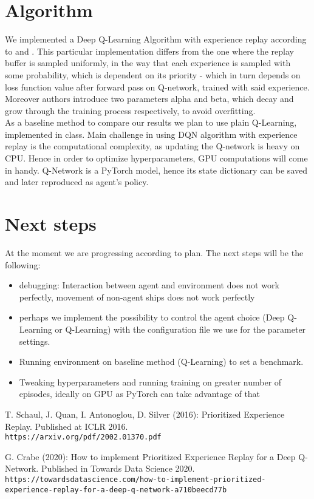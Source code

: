 \documentclass[11pt]{article} %
\begin{document}
\section{Algorithm}
We implemented a Deep Q-Learning Algorithm with experience replay according to \cite{schaul_2016} and \cite{crabe_2020}. This particular implementation differs from the one where the replay buffer is sampled uniformly, in the way that each experience is sampled with some probability, which is dependent on its priority - which in turn depends on loss function value after forward pass on Q-network, trained with said experience. Moreover authors introduce two parameters alpha and beta, which decay and grow through the training process respectively, to avoid overfitting. \\
As a baseline method to compare our results we plan to use plain Q-Learning, implemented in class. Main challenge in using DQN algorithm with experience replay is the computational complexity, as updating the Q-network is heavy on CPU. Hence in order to optimize hyperparameters, GPU computations will come in handy. Q-Network is a PyTorch model, hence its state dictionary can be saved and later reproduced as agent's policy.

\section{Next steps}
At the moment we are progressing according to plan. The next steps will be the following:
\begin{itemize}
	\item debugging: Interaction between agent and environment does not work perfectly, movement of non-agent ships does not work perfectly
	\item perhaps we implement the possibility to control the agent choice (Deep Q-Learning or Q-Learning) with the configuration file we use for the parameter settings.
	\item Running environment on baseline method (Q-Learning) to set a benchmark.
	\item Tweaking hyperparameters and running training on greater number of episodes, ideally on GPU as PyTorch can take advantage of that

\end{itemize}



\begin{thebibliography}{2}

T. Schaul, J. Quan, I. Antonoglou, D. Silver (2016): Prioritized Experience Replay. Published at ICLR 2016.\\
\texttt{https://arxiv.org/pdf/2002.01370.pdf}

G. Crabe (2020): 
How to implement Prioritized Experience Replay for a Deep Q-Network. Published in Towards Data Science 2020.\\
\texttt{https://towardsdatascience.com/how-to-implement-prioritized-experience-replay-for-a-deep-q-network-a710beecd77b}

\end{thebibliography}
\end{document}
